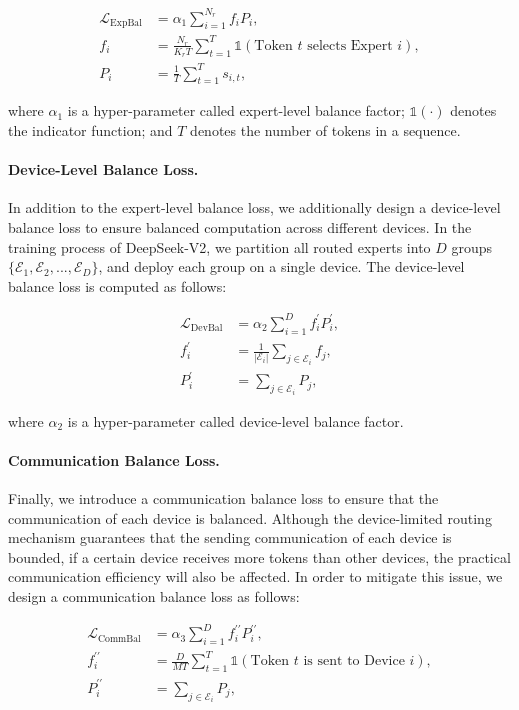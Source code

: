 \begin{align}
    \mathcal{L}_{\mathrm{ExpBal}} & = \alpha_1 \sum_{i=1}^{N_r}{f_i P_i}, \\
    f_i & = \frac{N_r}{K_r T} \sum_{t=1}^{T}{ \mathds{1}( \text{Token $t$ selects Expert $i$} )}, \\
    P_i & = \frac{1}{T} \sum_{t=1}^{T}{s_{i,t}},
\end{align}

where $\alpha_1$ is a hyper-parameter called expert-level balance factor; 
$\mathds{1}(\cdot)$ denotes the indicator function; and $T$ denotes the number of tokens in a sequence. 

\paragraph{Device-Level Balance Loss.} In addition to the expert-level balance loss, we additionally design a device-level balance loss to ensure balanced computation across different devices. In the training process of DeepSeek-V2, we partition all routed experts into $D$ groups $\{\mathcal{E}_1, \mathcal{E}_2, ..., \mathcal{E}_D \}$, and deploy each group on a single device. The device-level balance loss is computed as follows:

\begin{align}
    \mathcal{L}_{\mathrm{DevBal}} & = \alpha_{2} \sum_{i=1}^{D}{f_i^{\prime} P_i^{\prime}}, \\
    f_i^{\prime} & = \frac{1}{|\mathcal{E}_i|} \sum_{j \in \mathcal{E}_i}{ f_j }, \\
    P_i^{\prime} & = \sum_{j \in \mathcal{E}_i}{ P_j },
\end{align}

where $\alpha_{2}$ is a hyper-parameter called device-level balance factor. 

\paragraph{Communication Balance Loss.} Finally, we introduce a communication balance loss to ensure that the communication of each device is balanced. Although the device-limited routing mechanism guarantees that the sending communication of each device is bounded, if a certain device receives more tokens than other devices, the practical communication efficiency will also be affected. In order to mitigate this issue, we design a communication balance loss as follows:

\begin{align}
    \mathcal{L}_{\mathrm{CommBal}} & = \alpha_{3} \sum_{i=1}^{D}{f_i^{\prime\prime} P_i^{\prime\prime}}, \\
    f_i^{\prime\prime} & = \frac{D}{M T} \sum_{t=1}^{T}{ \mathds{1}( \text{Token $t$ is sent to Device $i$} )}, \\
    P_i^{\prime\prime} & = \sum_{j \in \mathcal{E}_i}{ P_j },
\end{align}

